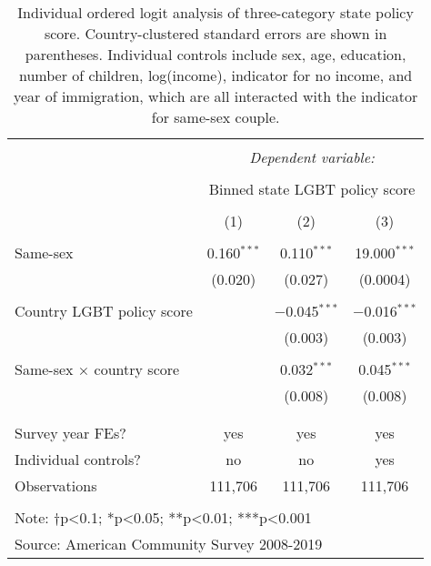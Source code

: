 \documentclass[
  11pt,
]{article}
\begin{document}
\begin{table}[!htbp] \centering 
  \caption{Individual ordered logit analysis of three-category state policy score. Country-clustered standard errors are shown in parentheses. Individual controls include sex, age, education, number of children, log(income), indicator for no income, and year of immigration, which are all interacted with the indicator for same-sex couple.} 
  \label{tab:ord} 
\begin{tabular}{@{\extracolsep{5pt}}lccc} 
\\[-1.8ex]\hline 
\hline \\[-1.8ex] 
 & \multicolumn{3}{c}{\textit{Dependent variable:}} \\ 
\cline{2-4} 
\\[-1.8ex] & \multicolumn{3}{c}{Binned state LGBT policy score} \\ 
\\[-1.8ex] & (1) & (2) & (3)\\ 
\hline \\[-1.8ex] 
 Same-sex & 0.160$^{***}$ & 0.110$^{***}$ & 19.000$^{***}$ \\ 
  & (0.020) & (0.027) & (0.0004) \\ 
  & & & \\ 
 Country LGBT policy score &  & $-$0.045$^{***}$ & $-$0.016$^{***}$ \\ 
  &  & (0.003) & (0.003) \\ 
  & & & \\ 
 Same-sex × country score &  & 0.032$^{***}$ & 0.045$^{***}$ \\ 
  &  & (0.008) & (0.008) \\ 
  & & & \\ 
\hline \\[-1.8ex] 
Survey year FEs? & yes & yes & yes \\ 
Individual controls? & no & no & yes \\ 
Observations & 111,706 & 111,706 & 111,706 \\ 
\hline 
\hline \\[-1.8ex] 
\multicolumn{4}{l}{Note: †p<0.1; *p<0.05; **p<0.01; ***p<0.001} \\ 
\multicolumn{4}{l}{Source: American Community Survey 2008-2019} \\ 
\end{tabular} 
\end{table}
\end{document}
